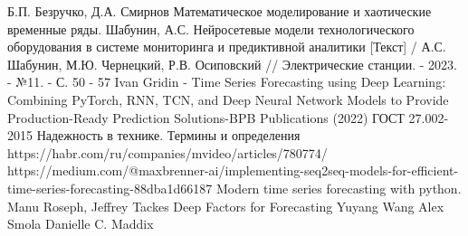 \documentclass[12pt,a4paper]{article}
\begin{document}
\newpage
\begin{thebibliography}{}
	 Б.П. Безручко, Д.А. Смирнов Математическое моделирование и хаотические временные ряды.
	 Шабунин, А.С. Нейросетевые модели технологического оборудования в системе мониторинга и предиктивной аналитики [Текст] / А.С. Шабунин, М.Ю. Чернецкий, Р.В. Осиповский // Электрические станции. - 2023. - №11. - С. 50 - 57
	 Ivan Gridin - Time Series Forecasting using Deep Learning: Combining PyTorch, RNN, TCN, and Deep Neural Network Models to Provide Production-Ready Prediction Solutions-BPB Publications (2022)
	 ГОСТ 27.002-2015 Надежность в технике. Термины и определения
	 https://habr.com/ru/companies/mvideo/articles/780774/
	 https://medium.com/@maxbrenner-ai/implementing-seq2seq-models-for-efficient-time-series-forecasting-88dba1d66187
	 Modern time series forecasting with python. Manu Roseph, Jeffrey Tackes
	 Deep Factors for Forecasting Yuyang Wang Alex Smola Danielle C. Maddix 
\end{thebibliography}
\end{document}
